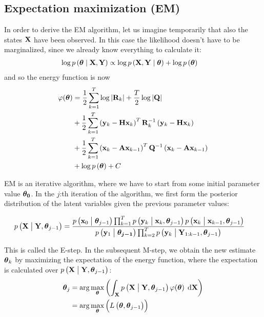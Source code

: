 \documentclass[12pt,a4paper,oneside,article]{memoir}
\begin{document}
\subsection{Expectation maximization (EM)}
In order to derive the EM algorithm, let us imagine temporarily
that also the states $\mathbf{X}$ have been observed. In this case the likelihood
doesn't have to be marginalized, since we already know everything
to calculate it:
\begin{align}
	\log\Pdf{\gv{\theta}}{\v{X},\v{Y}}&\propto\log\Pdf{\v{X},\v{Y}}{\gv{\theta}}+\log\Pdf{\gv{\theta}}
	\label{eq:complete_data_lh_em}
\end{align}
and so the energy function is now
\begin{align}
	\varphi(\gv{\theta})&=
	\frac{1}{2}\sum_{k=1}^T\log\abbs{\v{R}_k}+\frac{T}{2}\log\abbs{\v{Q}}\\
	&+\frac{1}{2}\sum_{k=1}^T\left(\v{y}_k-\v{Hx}_k\right)^T\v{R}_k^{-1}\left(\v{y}_k-\v{Hx}_k\right)\\
	&+\frac{1}{2}\sum_{k=1}^T\left(\v{x}_k-\v{A}\v{x}_{k-1}\right)^T\v{Q}^{-1}\left(\v{x}_k-\v{A}\v{x}_{k-1}\right)\\
	&+\log\Pdf{\gv{\theta}}+C
	\label{eq:energyf_em}
\end{align}



EM is an iterative algorithm, where we have to start from some initial parameter
value $\boldsymbol{{\theta}_0}$. In the $j$:th iteration of the algorithm, we first form
the posterior distribution of the latent variables given the previous parameter values:

\begin{align}
	\Pdf{\v{X}}{\v{Y},\gv{\theta}_{j-1}}&=
	\frac{\Pdf{\v{x}_0}{\gv{\theta}_{j-1}}\prod_{k=1}^T\Pdf{\v{y}_k}{\v{x}_{k},\gv{\theta}_{j-1}}\Pdf{\v{x}_k}{\v{x}_{k-1},\gv{\theta}_{j-1}}}{\Pdf{\v{y}_1}{\gv{\theta_{j-1}}}\prod_{k=2}^T
	\Pdf{\v{y}_k}{\v{Y}_{1:k-1},\gv{\theta}_{j-1}}}
\end{align}

This is called the E-step. In the subsequent M-step, we obtain the new estimate
$\boldsymbol{\theta}_k$ by maximizing the expectation of the energy function, where
the expectation is calculated over $\Pdf{\v{X}}{\v{Y},\gv{\theta}_{j-1}}$:
\begin{align}
	\gv{\theta}_j&=\arg\max_{\gv{\theta}}\left(\defint{\v{X}}{}{\Pdf{\v{X}}{\v{Y},\gv{\theta}_{j-1}}\varphi(\gv{\theta})}{\v{X}}\right)\\
	&=\arg\max_{\gv{\theta}}\left(L\left(\gv{\theta},\gv{\theta}_{j-1}\right)\right)
\end{align}
\end{document}
